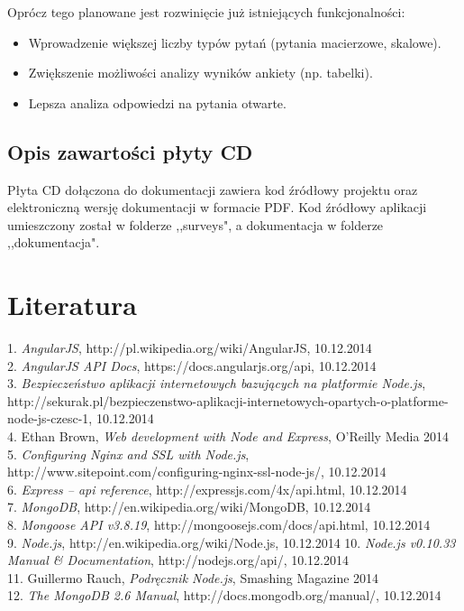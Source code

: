 \documentclass[8pt,a4paper,notitlepage]{article}
\begin{document}
Oprócz tego planowane jest rozwinięcie już istniejących funkcjonalności:
\begin{itemize}
\item Wprowadzenie większej liczby typów pytań (pytania macierzowe, skalowe).
\item Zwiększenie możliwości analizy wyników ankiety (np. tabelki).
\item Lepsza analiza odpowiedzi na pytania otwarte.
\end{itemize}

\subsection{Opis zawartości płyty CD}
Płyta CD dołączona do dokumentacji zawiera kod źródłowy projektu oraz elektroniczną wersję dokumentacji w formacie PDF. Kod źródłowy aplikacji umieszczony został w folderze ,,surveys", a dokumentacja w folderze ,,dokumentacja".

\newpage
\section*{Literatura}

%
1. \textit{AngularJS}, http://pl.wikipedia.org/wiki/AngularJS, 10.12.2014 \\
2. \textit{AngularJS API Docs}, https://docs.angularjs.org/api, 10.12.2014 \\
3. \textit{Bezpieczeństwo aplikacji internetowych bazujących na platformie Node.js}, http://sekurak.pl/bezpieczenstwo-aplikacji-internetowych-opartych-o-platforme-node-js-czesc-1, 10.12.2014 \\
4. Ethan Brown, \textit{Web development with Node and Express}, O’Reilly Media 2014 \\
5. \textit{Configuring Nginx and SSL with Node.js}, http://www.sitepoint.com/configuring-nginx-ssl-node-js/, 10.12.2014 \\
6. \textit{Express – api reference}, http://expressjs.com/4x/api.html, 10.12.2014 \\
7. \textit{MongoDB}, http://en.wikipedia.org/wiki/MongoDB, 10.12.2014 \\ 
8. \textit{Mongoose API v3.8.19}, http://mongoosejs.com/docs/api.html, 10.12.2014 \\
9. \textit{Node.js}, http://en.wikipedia.org/wiki/Node.js, 10.12.2014
10. \textit{Node.js v0.10.33 Manual \& Documentation}, http://nodejs.org/api/, 10.12.2014 \\
11. Guillermo Rauch, \textit{Podręcznik Node.js}, Smashing Magazine 2014 \\
12. \textit{The MongoDB 2.6 Manual}, http://docs.mongodb.org/manual/, 10.12.2014 \\






\newpage
\listoffigures
\newpage
\lstlistoflistings
\newpage
\end{document}
